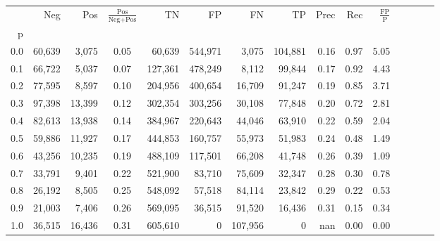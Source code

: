 \begin{tabular}{rrrcrrrrrrrrrrr}
\toprule
{} &     Neg &     Pos & $\frac{\text{Pos}}{\text{Neg}+\text{Pos}}$ &       TN &       FP &       FN &       TP &  Prec &   Rec & $\frac{\text{FP}}{\text{P}}$ \\
p   &         &         &                                            &          &          &          &          &       &       &                              \\
\midrule
0.0 &  60,639 &   3,075 &                                       0.05 &   60,639 &  544,971 &    3,075 &  104,881 &  0.16 &  0.97 &                         5.05 \\
0.1 &  66,722 &   5,037 &                                       0.07 &  127,361 &  478,249 &    8,112 &   99,844 &  0.17 &  0.92 &                         4.43 \\
0.2 &  77,595 &   8,597 &                                       0.10 &  204,956 &  400,654 &   16,709 &   91,247 &  0.19 &  0.85 &                         3.71 \\
0.3 &  97,398 &  13,399 &                                       0.12 &  302,354 &  303,256 &   30,108 &   77,848 &  0.20 &  0.72 &                         2.81 \\
0.4 &  82,613 &  13,938 &                                       0.14 &  384,967 &  220,643 &   44,046 &   63,910 &  0.22 &  0.59 &                         2.04 \\
0.5 &  59,886 &  11,927 &                                       0.17 &  444,853 &  160,757 &   55,973 &   51,983 &  0.24 &  0.48 &                         1.49 \\
0.6 &  43,256 &  10,235 &                                       0.19 &  488,109 &  117,501 &   66,208 &   41,748 &  0.26 &  0.39 &                         1.09 \\
0.7 &  33,791 &   9,401 &                                       0.22 &  521,900 &   83,710 &   75,609 &   32,347 &  0.28 &  0.30 &                         0.78 \\
0.8 &  26,192 &   8,505 &                                       0.25 &  548,092 &   57,518 &   84,114 &   23,842 &  0.29 &  0.22 &                         0.53 \\
0.9 &  21,003 &   7,406 &                                       0.26 &  569,095 &   36,515 &   91,520 &   16,436 &  0.31 &  0.15 &                         0.34 \\
1.0 &  36,515 &  16,436 &                                       0.31 &  605,610 &        0 &  107,956 &        0 &   nan &  0.00 &                         0.00 \\
\bottomrule
\end{tabular}
